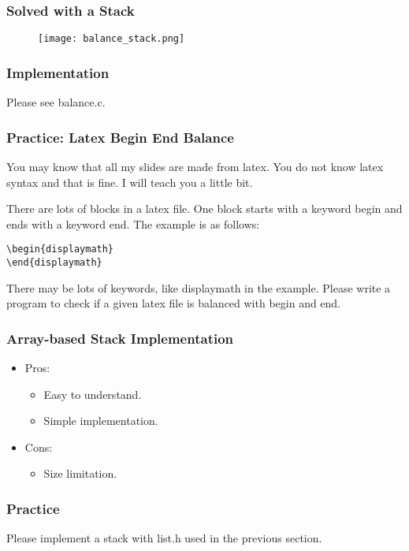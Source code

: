 \documentclass[11pt]{beamer}
\begin{document}
\begin{frame}
\frametitle{Solved with a Stack}
\begin{figure}
\centering
\texttt{[image: balance\_stack.png]}
\end{figure}
\end{frame}

\begin{frame}
\frametitle{Implementation}
Please see balance.c.
\end{frame}

\begin{frame}[fragile]
\frametitle{Practice: Latex Begin End Balance}
You may know that all my slides are made from latex. You do not know latex syntax and that is fine. I will teach you a little bit. 

There are lots of {\color{blue}blocks} in a latex file. One block starts with a keyword {\color{red}begin} and ends with a keyword {\color{red}end}. The example is as follows:
\begin{lstlisting}
\begin{displaymath}
\end{displaymath}
\end{lstlisting}
There may be lots of {\color{purple}keywords}, like displaymath in the example. Please write a program to check if a given latex file is balanced with begin and end.
\end{frame}

\begin{frame}
\frametitle{Array-based Stack Implementation}
\begin{itemize}
\item Pros:
    \begin{itemize}
    \item Easy to understand.
    \item Simple implementation.
    \end{itemize}
\item Cons:
    \begin{itemize}
    \item Size limitation.
    \end{itemize}
\end{itemize}

\end{frame}

\begin{frame}
\frametitle{Practice}
Please implement a stack with list.h used in the previous section.
\end{frame}
\end{document}
